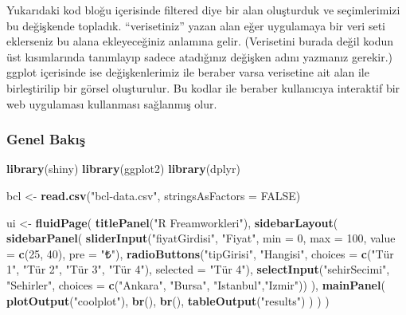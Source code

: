 \documentclass[]{book}
\newenvironment{Shaded}{\begin{snugshade}}{\end{snugshade}}
\newcommand{\KeywordTok}[1]{\textcolor[rgb]{0.13,0.29,0.53}{\textbf{#1}}}
\newcommand{\DataTypeTok}[1]{\textcolor[rgb]{0.13,0.29,0.53}{#1}}
\newcommand{\DecValTok}[1]{\textcolor[rgb]{0.00,0.00,0.81}{#1}}
\newcommand{\StringTok}[1]{\textcolor[rgb]{0.31,0.60,0.02}{#1}}
\newcommand{\OtherTok}[1]{\textcolor[rgb]{0.56,0.35,0.01}{#1}}
\newcommand{\NormalTok}[1]{#1}
\begin{document}
Yukarıdaki kod bloğu içerisinde filtered diye bir alan oluşturduk ve
seçimlerimizi bu değişkende topladık. ``verisetiniz'' yazan alan eğer
uygulamaya bir veri seti eklerseniz bu alana ekleyeceğiniz anlamına
gelir. (Verisetini burada değil kodun üst kısımlarında tanımlayıp sadece
atadığınız değişken adını yazmanız gerekir.) ggplot içerisinde ise
değişkenlerimiz ile beraber varsa verisetine ait alan ile birleştirilip
bir görsel oluşturulur. Bu kodlar ile beraber kullanıcıya interaktif bir
web uygulaması kullanması sağlanmış olur.

\subsubsection{Genel Bakış}\label{genel-baks}

\begin{Shaded}
\begin{Highlighting}[]
\KeywordTok{library}\NormalTok{(shiny)}
\KeywordTok{library}\NormalTok{(ggplot2)}
\KeywordTok{library}\NormalTok{(dplyr)}

\NormalTok{bcl <-}\StringTok{ }\KeywordTok{read.csv}\NormalTok{(}\StringTok{"bcl-data.csv"}\NormalTok{, }\DataTypeTok{stringsAsFactors =} \OtherTok{FALSE}\NormalTok{)}

\NormalTok{ui <-}\StringTok{ }\KeywordTok{fluidPage}\NormalTok{(}
  \KeywordTok{titlePanel}\NormalTok{(}\StringTok{"R Freamworkleri"}\NormalTok{),}
  \KeywordTok{sidebarLayout}\NormalTok{(}
    \KeywordTok{sidebarPanel}\NormalTok{(}
      \KeywordTok{sliderInput}\NormalTok{(}\StringTok{"fiyatGirdisi"}\NormalTok{, }\StringTok{"Fiyat"}\NormalTok{, }\DataTypeTok{min =} \DecValTok{0}\NormalTok{, }\DataTypeTok{max =} \DecValTok{100}\NormalTok{,}
            \DataTypeTok{value =} \KeywordTok{c}\NormalTok{(}\DecValTok{25}\NormalTok{, }\DecValTok{40}\NormalTok{), }\DataTypeTok{pre =} \StringTok{"₺"}\NormalTok{),}
      \KeywordTok{radioButtons}\NormalTok{(}\StringTok{"tipGirisi"}\NormalTok{, }\StringTok{"Hangisi"}\NormalTok{,}
            \DataTypeTok{choices =} \KeywordTok{c}\NormalTok{(}\StringTok{"Tür 1"}\NormalTok{, }\StringTok{"Tür 2"}\NormalTok{, }\StringTok{"Tür 3"}\NormalTok{, }\StringTok{"Tür 4"}\NormalTok{),}
            \DataTypeTok{selected =} \StringTok{"Tür 4"}\NormalTok{),}
      \KeywordTok{selectInput}\NormalTok{(}\StringTok{"sehirSecimi"}\NormalTok{, }\StringTok{"Sehirler"}\NormalTok{,}
            \DataTypeTok{choices =} \KeywordTok{c}\NormalTok{(}\StringTok{"Ankara"}\NormalTok{, }\StringTok{"Bursa"}\NormalTok{, }\StringTok{"Istanbul"}\NormalTok{,}\StringTok{"Izmir"}\NormalTok{))}
\NormalTok{    ),}
    \KeywordTok{mainPanel}\NormalTok{(}
      \KeywordTok{plotOutput}\NormalTok{(}\StringTok{"coolplot"}\NormalTok{),}
      \KeywordTok{br}\NormalTok{(), }\KeywordTok{br}\NormalTok{(),}
      \KeywordTok{tableOutput}\NormalTok{(}\StringTok{"results"}\NormalTok{)}
\NormalTok{    )}
\NormalTok{  )}
\NormalTok{)}


\end{Highlighting}
\end{Shaded}
\end{document}
